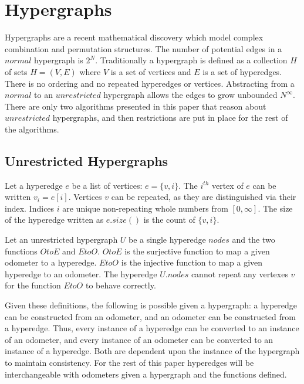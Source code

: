 














\chapter{Hypergraphs}
\label{Hypergraphs}
Hypergraphs are a recent mathematical discovery which model complex combination and permutation structures. The number of potential edges in a $normal$ hypergraph is $2^N$. Traditionally a hypergraph is defined as a collection $H$ of sets  $H=(V,E)$ where $V$ is a set of vertices and $E$ is a set of hyperedges. There is no ordering and no repeated hyperedges or vertices. Abstracting from a $normal$ to an $unrestricted$ hypergraph allows the edges to grow unbounded $N^\infty$. There are only two algorithms presented in this paper that reason about $unrestricted$ hypergraphs, and  then restrictions are put in place for the rest of the algorithms. 

\section{Unrestricted Hypergraphs}

\begin{definition}
Let a hyperedge $e$ be a list of vertices: $e =\{v,i\}$. The $i^{th}$  vertex of $e$ can be written $v_i = e[i]$. Vertices $v$ can be repeated, as they are distinguished via their index. Indices $i$ are unique non-repeating whole numbers from $[0,\infty]$. The size of the hyperedge written as $e.size()$ is the count of $\{v,i\}$.
\end{definition}

\begin{definition}
Let an unrestricted hypergraph $U$ be a single hyperedge $nodes$ and the two functions $OtoE$ and $EtoO$. $OtoE$ is the surjective function to map a given odometer to a hyperedge. $EtoO$ is the injective function to map a given hyperedge to an odometer. The hyperedge $U.nodes$ cannot repeat any vertexes $v$ for the function $EtoO$ to behave correctly.
\end{definition}

Given these definitions, the following is possible given a hypergraph: a hyperedge can be constructed from an odometer, and an odometer can be constructed from a hyperedge. Thus, every instance of a hyperedge can be converted to an instance of an odometer, and every instance of an odometer can be converted to an instance of a hyperedge. Both are dependent upon the instance of the hypergraph to maintain consistency. For the rest of this paper hyperedges will be interchangeable with odometers given a hypergraph and the functions defined.  

